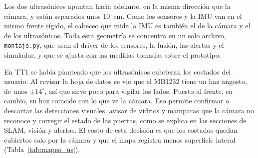 Los dos ultrasónicos apuntan hacia adelante, en la misma dirección que la cámara, y
están separados unos 10~cm. Como los sensores y la IMU van en el mismo frente rígido, el
cabeceo que mide la IMU es también el de la cámara y el de los ultrasónicos. Toda esta
geometría se concentra en un solo archivo, \texttt{montaje.py}, que usan el driver de
los sensores, la fusión, las alertas y el simulador, y que se ajusta con las medidas
tomadas sobre el prototipo.

En TT1 se había planteado que los ultrasónicos cubrieran los costados del usuario. Al
revisar la hoja de datos se vio que el MB1232 tiene un haz angosto, de unos
$\pm 14^\circ$, así que sirve poco para vigilar los lados. Puesto al frente, en cambio,
su haz coincide con lo que ve la cámara. Eso permite confirmar o descartar las
detecciones visuales, avisar de vidrios y mamparas que la cámara no reconoce y corregir
el estado de las puertas, como se explica en las secciones de SLAM, visión y alertas.
El costo de esta decisión es que los costados quedan cubiertos solo por la cámara y que
el mapa registra menos superficie lateral (Tabla~\ref{tab:mapeo_us}).
